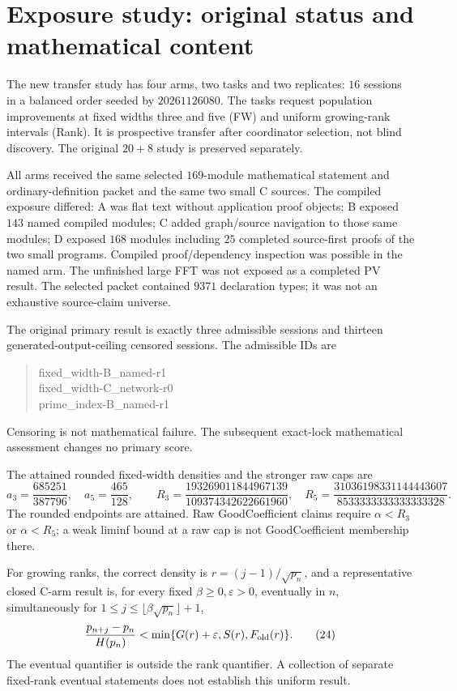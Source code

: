 \documentclass[11pt]{article}
\begin{document}
\section{Exposure study: original status and mathematical content}
The new transfer study has four arms, two tasks and two replicates:
\(16\) sessions in a balanced order seeded by \(20261126080\).
The tasks request population improvements at fixed widths three and five (FW)
and uniform growing-rank intervals (Rank). It is prospective transfer after
coordinator selection, not blind discovery.
The original \(20+8\) study is preserved separately.

All arms received the same selected \(169\)-module mathematical statement and
ordinary-definition packet and the same two small C sources. The compiled
exposure differed: A was flat text without application proof objects;
B exposed \(143\) named compiled modules; C added graph/source navigation to
those same modules; D exposed \(168\) modules including \(25\) completed
source-first proofs of the two small programs. Compiled proof/dependency
inspection was possible in the named arm. The unfinished large FFT was not
exposed as a completed PV result. The selected packet contained \(9371\)
declaration types; it was not an exhaustive source-claim universe.

The original primary result is exactly three admissible sessions and thirteen
generated-output-ceiling censored sessions. The admissible IDs are
\begin{quote}\ttfamily
fixed\_width-B\_named-r1\\
fixed\_width-C\_network-r0\\
prime\_index-B\_named-r1
\end{quote}
Censoring is not mathematical failure. The subsequent exact-lock
mathematical assessment changes no primary score.

The attained rounded fixed-width densities and the stronger raw caps are
\[
 a_3=\frac{685251}{387796},\quad a_5=\frac{465}{128},\qquad
 R_3=\frac{193269011844967139}{109374342622661960},\quad
 R_5=\frac{31036198331144443607}{8533333333333333328}.
 \tag{23}
\]
The rounded endpoints are attained. Raw GoodCoefficient claims require
\(\alpha<R_3\) or \(\alpha<R_5\); a weak liminf bound at a raw cap is not
GoodCoefficient membership there.

For growing ranks, the correct density is
\(r=(j-1)/\sqrt{p_n}\), and a representative closed C-arm result is, for every
fixed \(\beta\ge0,\varepsilon>0\), eventually in \(n\), simultaneously for
\(1\le j\le\lfloor\beta\sqrt{p_n}\rfloor+1\),
\[
 \frac{p_{n+j}-p_n}{H(p_n)}
 <\min\{G(r)+\varepsilon,S(r),F_{\rm old}(r)\}.
 \tag{24}\label{eq:24}
\]
The eventual quantifier is outside the rank quantifier.
A collection of separate fixed-rank eventual statements does not establish
this uniform result.
\end{document}
